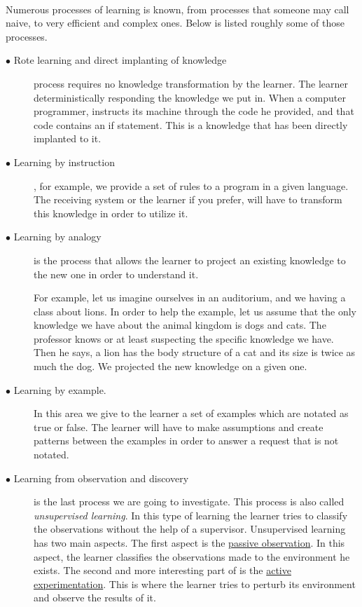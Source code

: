 \paragraph{} Numerous processes of learning is known, from processes that someone may call naive, to very efficient and complex ones. Below is listed roughly some of those processes.

\begin{description}
	\item[$\bullet$ Rote learning and direct implanting of knowledge] process requires no knowledge transformation by the learner. The learner deterministically responding the knowledge we put in. When a computer programmer, instructs its machine through the code he provided, and that code contains an if statement. This is a knowledge that has been directly implanted to it.
	\item[$\bullet$ Learning by instruction], for example, we provide a set of rules to a program in a given language. The receiving system or the learner if you prefer, will have to transform this knowledge in order to utilize it.
	\item[$\bullet$ Learning by analogy] is the process that allows the learner to project an existing knowledge to the new one in order to understand it.
	
	
	For example, let us imagine ourselves in an auditorium, and we having a class about lions. In order to help the example, let us assume that the only knowledge we have about the animal kingdom is dogs and cats. The professor knows or at least suspecting the specific knowledge we have. Then he says, a lion has the body structure of a cat and its size is twice as much the dog. We projected the new knowledge on a given one.
	
	\item[$\bullet$ Learning by example.] In this area we give to the learner a set of examples which are notated as true or false. The learner will have to make assumptions and create patterns between the examples in order to answer a request that is not notated.
	
	\item[$\bullet$ Learning from observation and discovery] is the last process we are going to investigate. This process is also called \textit{unsupervised learning}.
	In this type of learning the learner tries to classify the observations without the help of a supervisor. Unsupervised learning has two main aspects. The first aspect is the \underline{passive observation}. In this aspect, the learner classifies the observations made to the environment he exists. The second and more interesting part of is the \underline{active experimentation}. This is where the learner tries to perturb its environment and observe the results of it. 
	

\end{description}
